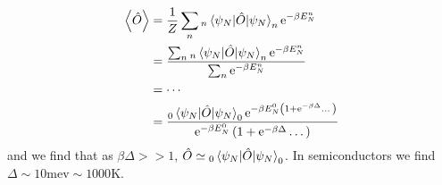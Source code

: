 \begin{align}
\expval{\hat{O}} &= \frac{1}{Z}\sum_n {}_n\expval{\hat{O}}{\psi_N}_n\mathrm{e}^{-\beta E_N^n} \nonumber\\
&= \frac{\sum_n {}_n\expval{\hat{O}}{\psi_N}_n\mathrm{e}^{-\beta E_N^n}}{\sum_n\mathrm{e}^{-\beta E_N^n}} \nonumber\\
&= \cdots \nonumber\\
&= \frac{{}_0\expval{\hat{O}}{\psi_N}_0\mathrm{e}^{-\beta E_N^0\left(1+\mathrm{e}^{-\beta\Delta}\dots\right)}}{\mathrm{e}^{-\beta E_N^0}\left(1+\mathrm{e}^{-\beta\Delta}\dots\right)}
\end{align}
and we find that as $\beta\Delta >> 1$, $\hat{O} \simeq {}_0\expval{\hat{O}}{\psi_N}_0$.
In semiconductors we find $\Delta \sim 10\mathrm{mev} \sim 1000\mathrm{K}$.



















